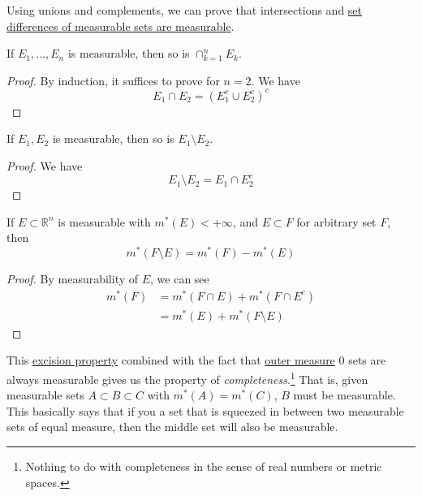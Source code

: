   Using unions and complements, we can prove that intersections and \hyperref[thm:set-differences-of-measurable-sets-are]{set differences of measurable sets are measurable}.  

  \begin{lemma}
    \label{thm:finite-intersections-of-measurable-sets-are}
    If $E_1, \ldots, E_n$ is measurable, then so is $\cap_{k=1}^n E_k$. 
  \end{lemma}
  \begin{proof}
    By induction, it suffices to prove for $n = 2$. We have 
    \begin{equation}
      E_1 \cap E_2 = (E_1^c \cup E_2^c)^c
    \end{equation}
  \end{proof}

  \begin{lemma}
    \label{thm:set-differences-of-measurable-sets-are}
    If $E_1, E_2$ is measurable, then so is $E_1 \setminus E_2$. 
  \end{lemma}
  \begin{proof}
    We have 
    \begin{equation}
      E_1 \setminus E_2 = E_1 \cap E_2^c
    \end{equation}
  \end{proof}

  \begin{lemma}
    \label{thm:excision-property}
    If $E \subset \mathbb{R}^n$ is measurable with $m^\ast (E) < +\infty$, and $E \subset F$ for arbitrary set $F$, then 
    \begin{equation}
      m^\ast (F \setminus E) = m^\ast(F) - m^\ast(E)
    \end{equation}
  \end{lemma}
  \begin{proof}
    By measurability of $E$, we can see 
    \begin{align}
      m^\ast (F) & = m^\ast (F \cap E) + m^\ast (F \cap E^c) \\
                 & = m^\ast (E) + m^\ast (F \setminus E)
    \end{align}
  \end{proof}

  This \hyperref[thm:excision-property]{excision property} combined with the fact that \hyperref[def:outer-measure]{outer measure} 0 sets are always measurable gives us the property of \textit{completeness}.\footnote{Nothing to do with completeness in the sense of real numbers or metric spaces.} That is, given measurable sets $A \subset B \subset C$ with $m^\ast(A) = m^\ast (C)$, $B$ must be measurable. This basically says that if you a set that is squeezed in between two measurable sets of equal measure, then the middle set will also be measurable. 

